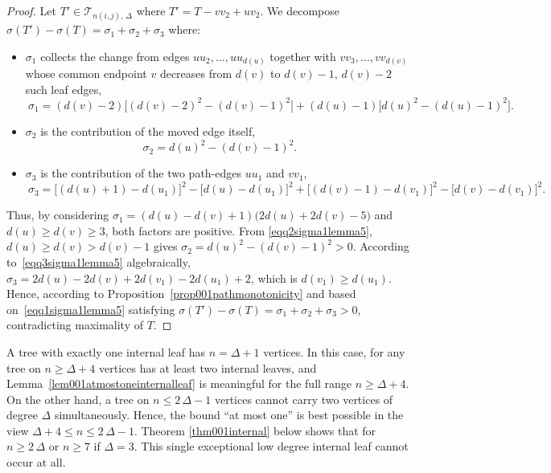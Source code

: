 \documentclass[12pt]{amsart}
\newcommand{\TT}{\mathcal{T}}
\begin{document}
\begin{proof}
Let $T'\in \TT_{n(i,j),\,\Delta}$ where $T' = T - vv_2 + uv_2$. We decompose $\sigma(T')-\sigma(T)=\sigma_1+\sigma_2+\sigma_3$ where:
\begin{itemize}
\item $\sigma_1$ collects the change from edges $uu_2,\dots,uu_{d(u)}$ together with $vv_3,\dots,vv_{d(v)}$ whose common endpoint $v$
decreases from $d(v)$ to $d(v)-1$, $d(v)-2$ such leaf edges, 
\begin{equation}~\label{eqq1sigma1lemma5}
\sigma_1\!=\! (d(v)\!-\!2)\Big[(d(v)\!-\!2)^2\!-\!(d(v)\!-\!1)^2\Big]\!+\!(d(u)\!-\!1)\Big[d(u)^2\!-\!(d(u)\!-\!1)^2\Big].
\end{equation}
\item $\sigma_2$ is the contribution of the moved edge itself, 
\begin{equation}~\label{eqq2sigma1lemma5}
\sigma_2 = d(u)^2 - (d(v)-1)^2.
\end{equation}
\item $\sigma_3$ is the contribution of the two path-edges $uu_1$ and $vv_1$,
\begin{equation}~\label{eqq3sigma1lemma5}
\sigma_3\! =\! \big[(d(u)\!+\!1)\!-\!d(u_1)\big]^2\! -\! \big[d(u)\!-\!d(u_1)\big]^2\!+\! \big[(d(v)\!-\!1)\!-\!d(v_1)\big]^2\!-\! \big[d(v)\!-\!d(v_1)\big]^2.
\end{equation}
\end{itemize}

Thus, by considering $\sigma_1 = (d(u)-d(v)+1)\big(2d(u)+2d(v)-5\big)$ and $d(u)\geqslant d(v)\geqslant 3$, both factors are positive. From \eqref{eqq2sigma1lemma5},
$d(u)\geqslant d(v)>d(v)-1$ gives $\sigma_2 = d(u)^2-(d(v)-1)^2>0$. According to~\eqref{eqq3sigma1lemma5} algebraically,
$\sigma_3 = 2d(u)-2d(v)+2d(v_1)-2d(u_1)+2$, which is $d(v_1)\geqslant d(u_1)$. Hence, according to Proposition~\ref{prop001pathmonotonicity} and based on~\eqref{eqq1sigma1lemma5} satisfying $\sigma(T')-\sigma(T)=\sigma_1+\sigma_2+\sigma_3>0$, contradicting maximality
of $T$.
\end{proof}

A tree with exactly one internal leaf has $n=\Delta+1$ vertices. In this case, for any tree
on $n\ge\Delta+4$ vertices has at least two internal leaves, and
Lemma~\ref{lem001atmostoneinternalleaf} is meaningful for the full range
$n\ge\Delta+4$. On the other hand, a tree on $n\leqslant 2\,\Delta-1$ vertices cannot
carry two vertices of degree $\Delta$ simultaneously. Hence,  the bound ``at most
one'' is best possible in the view $\Delta+4\leqslant n\leqslant 2\,\Delta-1$. Theorem
\ref{thm001internal} below shows that for $n\geqslant 2\,\Delta$ or
$n\geqslant 7$ if $\Delta=3$. This single exceptional low degree internal leaf cannot
occur at all.
\end{document}
